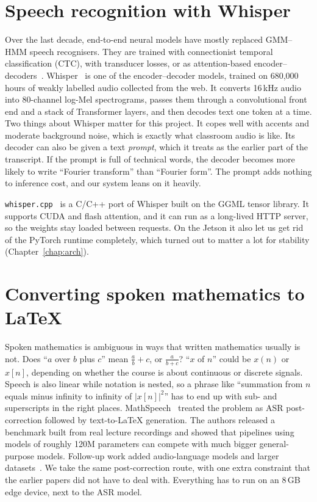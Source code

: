 \documentclass[11pt,a4paper,oneside]{report}
\theoremstyle{definition}
\begin{document}
\section{Speech recognition with Whisper}
Over the last decade, end-to-end neural models have mostly replaced GMM--HMM speech recognisers. They are trained with connectionist temporal classification (CTC), with transducer losses, or as attention-based encoder--decoders~\cite{vaswani2017attention}. Whisper~\cite{radford2023whisper} is one of the encoder--decoder models, trained on 680{,}000 hours of weakly labelled audio collected from the web. It converts 16\,kHz audio into 80-channel log-Mel spectrograms, passes them through a convolutional front end and a stack of Transformer layers, and then decodes text one token at a time. Two things about Whisper matter for this project. It copes well with accents and moderate background noise, which is exactly what classroom audio is like. Its decoder can also be given a text \emph{prompt}, which it treats as the earlier part of the transcript. If the prompt is full of technical words, the decoder becomes more likely to write ``Fourier transform'' than ``Fourier form''. The prompt adds nothing to inference cost, and our system leans on it heavily.

\texttt{whisper.cpp}~\cite{whispercpp} is a C/C++ port of Whisper built on the GGML tensor library. It supports CUDA and flash attention, and it can run as a long-lived HTTP server, so the weights stay loaded between requests. On the Jetson it also let us get rid of the PyTorch runtime completely, which turned out to matter a lot for stability (Chapter~\ref{chap:arch}).

\section{Converting spoken mathematics to LaTeX}
Spoken mathematics is ambiguous in ways that written mathematics usually is not. Does ``$a$ over $b$ plus $c$'' mean $\frac{a}{b}+c$, or $\frac{a}{b+c}$? ``$x$ of $n$'' could be $x(n)$ or $x[n]$, depending on whether the course is about continuous or discrete signals. Speech is also linear while notation is nested, so a phrase like ``summation from $n$ equals minus infinity to infinity of $|x[n]|^2$'' has to end up with sub- and superscripts in the right places. MathSpeech~\cite{hyeon2025mathspeech} treated the problem as ASR post-correction followed by text-to-LaTeX generation. The authors released a benchmark built from real lecture recordings and showed that pipelines using models of roughly 120M parameters can compete with much bigger general-purpose models. Follow-up work added audio-language models and larger datasets~\cite{korzh2025s2l}. We take the same post-correction route, with one extra constraint that the earlier papers did not have to deal with. Everything has to run on an 8\,GB edge device, next to the ASR model.
\end{document}
